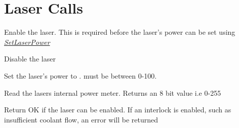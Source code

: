 \documentclass[letterpaper,10pt,english]{sphinxmanual}
\begin{document}
\begin{fulllineitems}
\end{fulllineitems}



\begin{fulllineitems}
\end{fulllineitems}



\begin{fulllineitems}
\end{fulllineitems}



\section{Laser Calls}
\label{remote_hardware:laser-calls-label}\label{remote_hardware:laser-calls}

\begin{fulllineitems}
Enable the laser.  This is required before the laser's power can be set using {\hyperref[remote_hardware:set-laser-power]{\emph{SetLaserPower}}}

\end{fulllineitems}



\begin{fulllineitems}
Disable the laser

\end{fulllineitems}

\label{remote_hardware:set-laser-power}

\begin{fulllineitems}
Set the laser's power to .  must be between 0-100.

\end{fulllineitems}



\begin{fulllineitems}
Read the lasers internal power meter. Returns an 8 bit value i.e 0-255

\end{fulllineitems}



\begin{fulllineitems}
Return OK if the laser can be enabled. If an interlock is enabled, such as insufficient coolant flow, an error will be returned

\end{fulllineitems}
\end{document}
